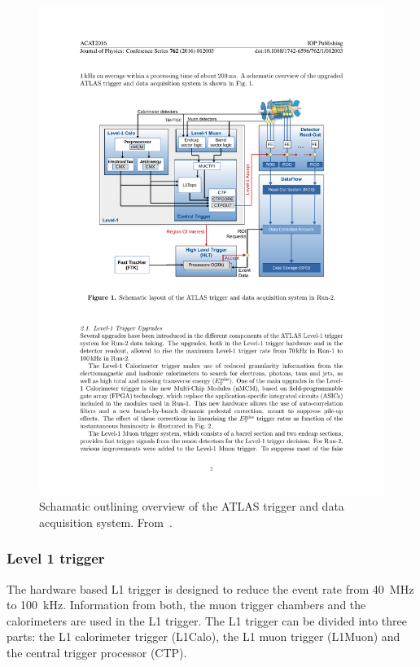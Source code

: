 \begin{figure}[]
    \centering
    \includegraphics[width=\largefigwidth]{images/TDAQ}
    \caption[Overview of the ATLAS trigger and data acquisition system]{Schamatic outlining overview of the ATLAS trigger and data acquisition system.
    From~\cite{ATLAS:TDAQ-Run2}.}
    \label{fig:method:ATLAS:TDAQ}
\end{figure}

\subsubsection{Level 1 trigger}
The hardware based L1 trigger is designed to reduce the event rate from \SI{40}{\mega\hertz} to \SI{100}{\kilo\hertz}. Information from both, the muon trigger chambers and the calorimeters are used in the L1 trigger. The L1 trigger can be divided into three parts: the L1 calorimeter trigger (L1Calo), the L1 muon trigger (L1Muon) and the central trigger processor (CTP).

